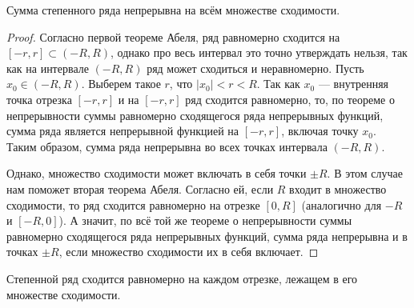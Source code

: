 \begin{Consequence}
Сумма степенного ряда непрерывна на всём множестве сходимости.
\end{Consequence}

\begin{proof}
Согласно первой теореме Абеля, ряд равномерно сходится на $\left [ -r,r \right ] \subset \left ( -R, R \right )$, однако про весь интервал это точно утверждать нельзя, так как на интервале $\left ( -R, R \right )$ ряд может сходиться и неравномерно. Пусть $x_{0}\in\left ( -R, R \right )$. Выберем такое $r$, что $|x_{0}|<r<R$. Так как $x_{0}$ --- внутренняя точка отрезка $\left [ -r, r \right ]$ и на $\left [ -r, r \right ]$ ряд  сходится равномерно, то, по теореме о непрерывности суммы равномерно сходящегося ряда непрерывных функций, сумма ряда является непрерывной функцией на $\left [ -r,r \right ]$, включая точку $x_{0}$.
Таким образом, сумма ряда непрерывна во всех точках интервала $\left ( -R, R \right )$.
 
Однако, множество сходимости может включать в себя точки $\pm R$. В этом случае нам поможет вторая теорема Абеля. Согласно ей, если $R$ входит в множество сходимости, то ряд сходится равномерно на отрезке $[0, R]$ (аналогично для $-R$ и $[-R, 0]$). А значит, по всё той же теореме о непрерывности суммы равномерно сходящегося ряда непрерывных функций, сумма ряда непрерывна и в точках $\pm R$, если множество сходимости их в себя включает.
\end{proof}

\begin{Consequence}
Степенной ряд сходится равномерно на каждом отрезке, лежащем в его множестве сходимости.
\end{Consequence}



